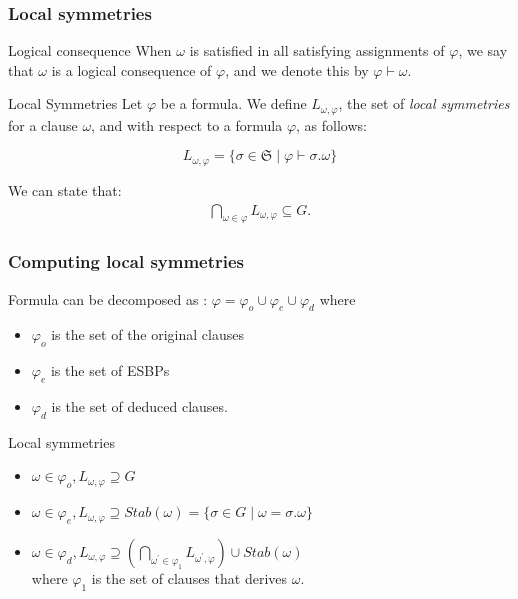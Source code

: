 \documentclass{beamer}
\begin{document}
\begin{frame}[noframenumbering]
\frametitle{Local symmetries}
\newcommand{\symm}[0]{\ensuremath{\mathfrak{S}}}

\begin{block}{Logical consequence}
	When $\omega$ is satisfied in all satisfying assignments of $\varphi$, we say that $\omega$ is a
	logical consequence of $\varphi$, and we denote this by $\varphi \vdash \omega$.
\end{block}	

\begin{block}{Local Symmetries}
	Let $\varphi$ be a formula. We define $L_{\omega,\varphi}$, 
	the set of \textit{local symmetries} for a clause $\omega$, and with respect to 
	a formula $\varphi$, as follows:
	
	$$L_{\omega,\varphi}=\{\sigma \in \symm \mid \varphi \vdash \sigma.\omega\}$$
\end{block}

 {
	\vfill
	We can state that:
	\begin{align*}
	\underset{\omega \in \varphi}{\bigcap}L_{\omega,\varphi} \subseteq G. %
	\end{align*}
}

\end{frame}
\begin{frame}[noframenumbering]
\frametitle{Computing local symmetries}

Formula can be decomposed as : $\varphi = \varphi_o \cup \varphi_e \cup \varphi_d$ where
\begin{itemize}
\item $\varphi_o$ is the set of the original clauses
\item $\varphi_e$ is the set of ESBPs 
\item $\varphi_d$ is the set of deduced clauses.
\end{itemize}

\vfill

Local symmetries
\begin{itemize}
\item $\omega \in \varphi_o, L_{\omega,\varphi} \supseteq G $ %
\item $\omega \in \varphi_e, L_{\omega,\varphi} \supseteq Stab(\omega)=\{\sigma \in G \mid
\omega = \sigma.\omega\}$
\item $\omega \in \varphi_d, L_{\omega,\varphi} \supseteq (\underset{\omega^\prime \in
	\varphi_1}{\bigcap}L_{\omega^\prime,\varphi}) \cup Stab(\omega)$ \\  where $\varphi_1$ is the set of clauses that derives $\omega$.
\end{itemize}

\end{frame}
\end{document}
